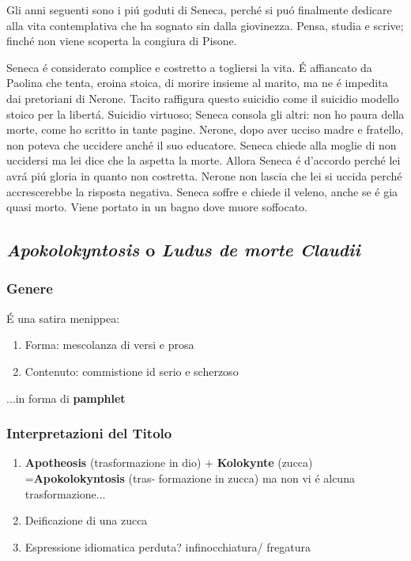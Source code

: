 \documentclass{article}
\begin{document}
Gli anni seguenti sono i piú goduti di Seneca, perché si puó finalmente dedicare alla vita contemplativa che ha sognato sin dalla giovinezza. Pensa, studia e scrive; finché non viene scoperta la congiura di Pisone.

Seneca é considerato complice e costretto a togliersi la vita. É affiancato da Paolina che tenta, eroina stoica, di morire insieme al marito, ma ne é impedita dai pretoriani di Nerone. Tacito raffigura questo suicidio come il suicidio modello stoico per la libertá. Suicidio virtuoso; Seneca consola gli altri: non ho paura della morte, come ho scritto in tante pagine. Nerone, dopo aver ucciso madre e fratello, non poteva che uccidere anché il suo educatore. Seneca chiede alla moglie di non uccidersi ma lei dice che la aspetta la morte. Allora Seneca é d'accordo perché lei avrá piú gloria in quanto non costretta. Nerone non lascia che lei si uccida perché accrescerebbe la risposta negativa. Seneca soffre e chiede il veleno, anche se é gia quasi morto. Viene portato in un bagno dove muore soffocato.
\subsection{\emph{Apokolokyntosis} o \emph{Ludus de morte Claudii}}
\subsubsection{Genere}
É una satira menippea:
\begin{enumerate}
    \item Forma: mescolanza di versi e prosa
    \item Contenuto: commistione id serio e scherzoso
\end{enumerate}
...in forma di \textbf{pamphlet}
\subsubsection{Interpretazioni del Titolo}
\begin{enumerate}
    \item \textbf{Apotheosis} (trasformazione in dio) + \textbf{Kolokynte} (zucca) =\textbf{Apokolokyntosis} (tras- formazione in zucca) ma non vi é alcuna trasformazione...
    \item Deificazione di una zucca
    \item Espressione idiomatica perduta? infinocchiatura/ fregatura
\end{enumerate}
\end{document}
